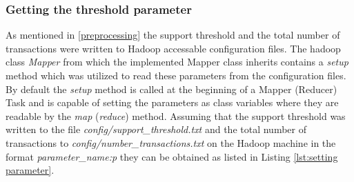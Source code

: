 \subsubsection{Getting the threshold parameter}\label{set parameter}
As mentioned in \ref{preprocessing} the support threshold and the total number of transactions were written to Hadoop accessable configuration files. The hadoop class \textit{Mapper} from which the implemented Mapper class inherits contains a \textit{setup} method which was utilized to read these parameters from the configuration files. By default the \textit{setup} method is called at the beginning of a Mapper (Reducer) Task and is capable of setting the parameters as class variables where they are readable by the \textit{map} (\textit{reduce}) method. Assuming that the support threshold was written to the file \textit{config/support\_threshold.txt} and the total number of transactions to \textit{config/number\_transactions.txt} on the Hadoop machine in the format \textit{parameter\_name:p} they can be obtained as listed in Listing \ref{lst:setting parameter}.

